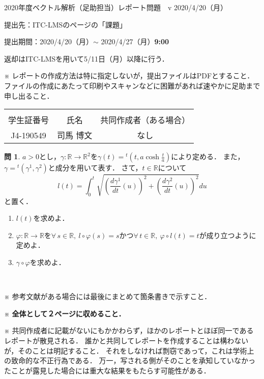 \documentclass[dvipdfmx,nosetpagesize, uplatex]{jsarticle}
\theoremstyle{definition}
\newtheorem*{question*}{問}
\theoremstyle{StatementsWithStar}
\theoremstyle{StatementsWithStar2}
\theoremstyle{StatementsWithStar3}
\theoremstyle{StatementsWithCCirc}
\theoremstyle{definition}
\begin{document}
\thispagestyle{empty}
\setlength{\parindent}{1zw}
\setlength{\baselineskip}{13pt}
\setcounter{section}{1}
\setcounter{version}{1}
\noindent
2020年度ベクトル解析（足助担当）レポート問題~\thesection~v\theversion%
\hfil2020/4/20（月）\par\noindent
提出先：ITC-LMSのページの「課題」\par\noindent
提出期間：2020/4/20（月）$\sim$ 2020/4/27（月）\textbf{9:00}\par\noindent
返却はITC-LMSを用いて5/11日（月）以降に行う．\par\noindent
※ レポートの作成方法は特に指定しないが，提出ファイルはPDFとすること．
ファイルの作成にあたって印刷やスキャンなどに困難があれば速やかに足助まで申し出ること．
\vskip-18pt\noindent
\begin{table}[h]
\begin{tabular}{|c|c|c|} \hline
& & \\[-13pt]
学生証番号& 氏名 & 共同作成者（ある場合）\\[2pt] \hline
\parbox[c]{9.2zw}{\centering J4-190549} & \parbox[c]{13.0zw}{\centering 司馬 博文} & \parbox[c]{25.6zw}{\centering なし}\\[12pt] \hline
\end{tabular}
\end{table}
\vskip-12pt\noindent
% 
\begin{question*}
$a>0$とし，$\gamma\colon\mathbb{R}\to\mathbb{R}^2$を$\gamma(t)={}^t\left(t,a\cosh\frac{t}a\right)$により定める．
また，$\gamma={}^t(\gamma^1,\gamma^2)$と成分を用いて表す．
さて，$t\in\mathbb{R}$について
\[
l(t)=\int_0^t\sqrt{\left(\dfrac{d\gamma^1}{dt}(u)\right)^2+\left(\dfrac{d\gamma^2}{dt}(u)\right)^2}du
\]
と置く．
\begin{enumerate}[1)]
\item
$l(t)$を求めよ．
\item
$\varphi\colon\mathbb{R}\to\mathbb{R}$を$\forall\,s\in\mathbb{R},\ l\circ\varphi(s)=s$かつ$\forall\,t\in\mathbb{R},\ \varphi\circ l(t)=t$が成り立つように定めよ．
\item
$\gamma\circ\varphi$を求めよ．
\end{enumerate}
\end{question*}
\par
\ \par
\noindent
{\small
※ 参考文献がある場合には最後にまとめて箇条書きで示すこと．\par\noindent
※ \textbf{全体として２ページに収めること．}\par\noindent
※ 共同作成者に記載がないにもかかわらず，ほかのレポートとほぼ同一であるレポートが散見される．
誰かと共同してレポートを作成することは構わないが，そのことは明記すること．
それをしなければ剽窃であって，これは学術上の致命的な不正行為である．
万一，写される側がそのことを承知していなかったことが露見した場合には重大な結果をもたらす可能性がある．
}
\end{document}
